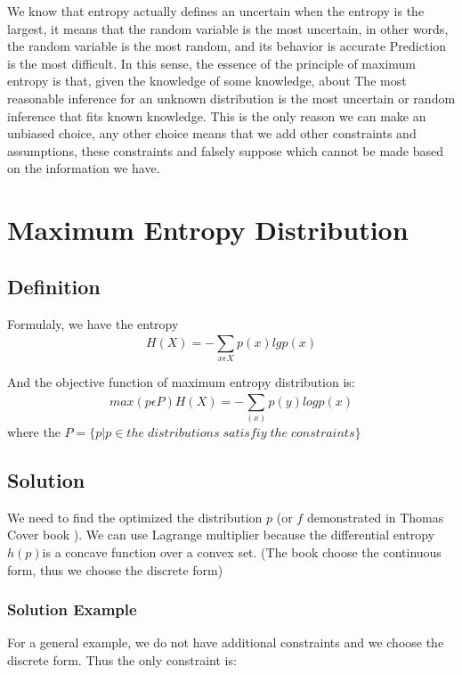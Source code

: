 \documentclass[12pt, a4paper]{article}
\begin{document}
We know that entropy actually defines an uncertain when the entropy is the largest, it means that the random variable is the most uncertain, in other words, the random variable is the most random, and its behavior is accurate
Prediction is the most difficult. In this sense, the essence of the principle of maximum entropy is that, given the knowledge of some knowledge, about
The most reasonable inference for an unknown distribution is the most uncertain or random inference that fits known knowledge. This is the only reason we can make an unbiased choice, any other choice means that we add other constraints and assumptions, these constraints and falsely
suppose which cannot be made based on the information we have. 


\section{Maximum Entropy Distribution}

\subsection{Definition}
Formulaly, we have the entropy
\begin{equation}
H(X)=-\sum_{x\epsilon X}^{ }p(x)lgp(x)
\end{equation}


And the objective function of maximum entropy distribution is:
\begin{equation}
max(p\epsilon P)H(X)=-\sum_{(x)}^{ }p(y)logp(x)\label{MED}
\end{equation}
where the $P=\{p|p \in the \; distributions \; satisfiy \;the \;constraints\}$



\subsection{Solution}
We need to find the optimized the distribution $p$ (or $f$ demonstrated in Thomas Cover book \cite{10.5555/1146355}). 
We can use Lagrange multiplier because the differential entropy $h(p)$is a concave function over a convex set. (The book choose the continuous form, thus we choose the discrete form)

\subsubsection{Solution Example}
For a general example, we do not have additional constraints and we choose the discrete form. Thus the only constraint is:
\end{document}
